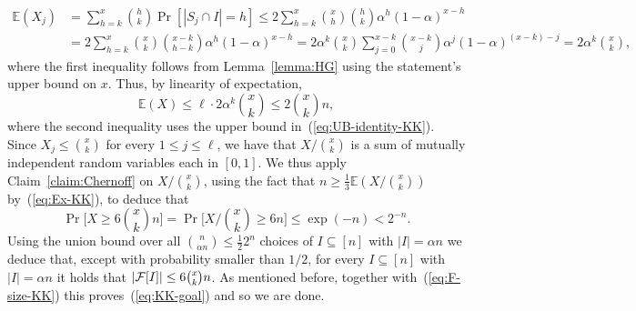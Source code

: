 \documentclass[11pt]{article}
\makeatletter
\renewenvironment{proof}[1][\proofname]
{\par\pushQED{\qed}
	\normalfont\topsep6\p@\@plus6\p@\relax\trivlist
	\item[\hskip\labelsep\bfseries#1\@addpunct{.}]
	\ignorespaces}
{\popQED\endtrivlist\@endpefalse}
\newcommand{\FF}{{\cal F}}
\renewcommand{\a}{\alpha}
\newcommand{\sub}{\subseteq}
\newcommand{\Ex}{\mathbb{E}}
\makeatother
\begin{document}
\begin{proof}[Proof of Theorem~\ref{theo:sKK-UB}]
	\begin{align*}
	\Ex(X_j) &= \sum_{h=k}^x \binom{h}{k}\Pr[|S_j \cap I|=h] 
	\le 2\sum_{h=k}^x\binom{x}{h}\binom{h}{k} \a^h(1-\a)^{x-h}\\
	&= 2\sum_{h=k}^x\binom{x}{k}\binom{x-k}{h-k} \a^h(1-\a)^{x-h}
	= 2\a^k\binom{x}{k}\sum_{j=0}^{x-k}\binom{x-k}{j} \a^j(1-\a)^{(x-k)-j}
	= 2\a^k\binom{x}{k},
	\end{align*}
	where the first inequality follows from Lemma~\ref{lemma:HG} using the statement's upper bound on $x$.
	Thus, by linearity of expectation,
	\begin{equation}\label{eq:Ex-KK}
	\Ex(X) \le \ell \cdot 2\a^k \binom{x}{k} \le 2\binom{x}{k}n,
	\end{equation}
	where the second inequality uses the upper bound in~(\ref{eq:UB-identity-KK}).
	Since $X_j \le \binom{x}{k}$ for every $1 \le j \le \ell$, 
	we have that $X/\binom{x}{k}$ is a sum of mutually independent random variables each in $[0,1]$.
	We thus apply Claim~\ref{claim:Chernoff} on $X/\binom{x}{k}$, using the fact that $n \ge \frac13\Ex(X/\binom{x}{k})$ by~(\ref{eq:Ex-KK}), to deduce that
	$$\Pr\Big[X \ge 6\binom{x}{k}n\Big] = \Pr\Big[X/\binom{x}{k} \ge 6n\Big] \le \exp(-n) < 2^{-n}.$$
	Using the union bound over all $\binom{n}{\a n} \le \frac12 2^n$ choices of $I \sub [n]$ with $|I|=\a n$ we deduce 
	that, except with probability smaller than $1/2$, for every $I \sub [n]$ with $|I|=\a n$ it holds that $|\FF[I]| \le 6\binom{x}{k}n$. As mentioned before, together with~(\ref{eq:F-size-KK}) this proves~(\ref{eq:KK-goal}) and so we are done.
\end{proof}
\end{document}
